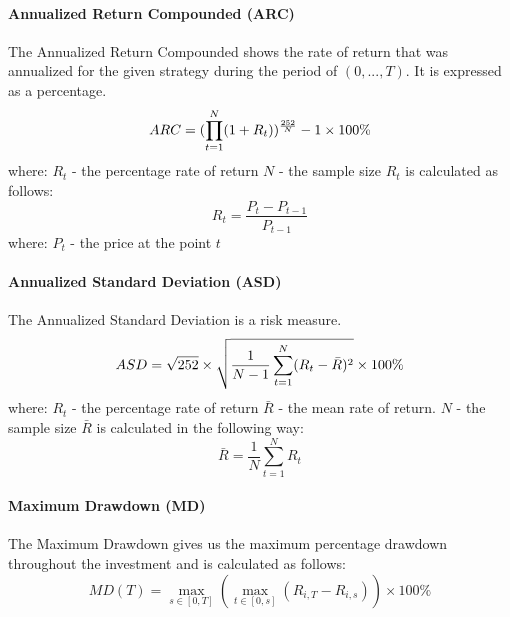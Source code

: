 \documentclass[]{elsarticle}
\begin{document}
\paragraph{Annualized Return Compounded (ARC)}
The Annualized Return Compounded shows the rate of return that
was annualized for the given strategy during the period of
\((0,...,T)\). It is expressed as a percentage.
\begin{equation}
\label{eq:arc}
ARC = (\space\prod_{t=1}^{N} \space (1+R_t)\space)^{\frac{252}{N}} - 1 \times 100\%
\end{equation}
where: \newline \(R_t\) - the percentage rate of return \newline
\(N\) - the sample size \newline \(R_t\) is calculated as follows:
\begin{equation}
\label{eq:rt}
R_t = \frac{P_t - P_{t-1}}{P_{t-1}}
\end{equation}
where: \newline \(P_t\) - the price at the point \(t\) \newline

\paragraph{Annualized Standard Deviation (ASD)}
The Annualized Standard Deviation is a risk measure.
\begin{equation}
\label{eq:asd}
ASD = \sqrt{252} \space\times\space \sqrt{\frac{1}{N-1}\sum_{t=1}^{N}\space(R_t\space - \bar{R})^2} \times 100\%
\end{equation}
where: \newline \(R_t\) - the percentage rate of return \newline
\(\bar{R}\) - the mean rate of return. \newline \(N\) - the sample size \newline \(\bar{R}\) is calculated in the following way:
\begin{equation}
\label{eq:rbar}
\bar{R} = \frac{1}{N} \sum_{t=1}^{N} R_t
\end{equation}

\paragraph{Maximum Drawdown (MD)}
The Maximum Drawdown gives us the maximum percentage drawdown
throughout the investment and is calculated as follows:
\begin{equation}
\label{eq:md}
MD(T) = \mathop{\mathrm{max}}_{s \in [0,T]} 
\left(\mathop{\mathrm{max}}_{t \in [0,s]}(R_{i,T} - R_{i,s})\right) \times 100\%
\end{equation}
\end{document}
